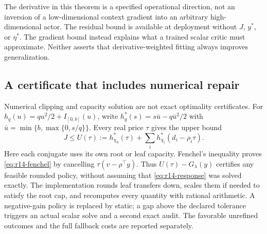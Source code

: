 The derivative in this theorem is a specified operational direction, not an inversion of a low-dimensional context gradient into an arbitrary high-dimensional actor. The residual bound is available at deployment without $J$, $y^*$, or $\eta^*$. The gradient bound instead explains what a trained scalar critic must approximate. Neither asserts that derivative-weighted fitting always improves generalization.

\subsection{A certificate that includes numerical repair}
Numerical clipping and capacity solution are not exact optimality certificates. For $h_q(u)=qu^2/2+I_{[0,b]}(u)$, write
$h_q^*(s)=s\bar u-q\bar u^2/2$ with $\bar u=\min\{b,\max\{0,s/q\}\}$. Every real price $\tau$ gives the upper bound
\begin{equation}\label{eq:r14-fenchel}
 J\leq U(\tau):=h_{\chi_0}^*(\tau)+\sum_i h_{\chi_i}^*(d_i-\rho_i\tau).
\end{equation}
Here each conjugate uses its own root or leaf capacity. Fenchel's inequality proves \eqref{eq:r14-fenchel} by cancelling $\tau(v-\rho^\top y)$. Thus $U(\tau)-G_\lambda(y)$ certifies any feasible rounded policy, without assuming that \eqref{eq:r14-response} was solved exactly. The implementation rounds leaf transfers down, scales them if needed to satisfy the root cap, and recomputes every quantity with rational arithmetic. A negative-gain policy is replaced by static; a gap above the declared tolerance triggers an actual scalar solve and a second exact audit. The favorable unrefined outcomes and the full fallback costs are reported separately.
